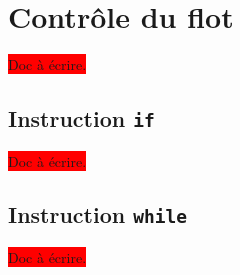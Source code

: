 




\chapter{Contrôle du flot}

\colorbox{red}{Doc à écrire.}


\section{Instruction \texttt{if}}

\colorbox{red}{Doc à écrire.}


\section{Instruction \texttt{while}}

\colorbox{red}{Doc à écrire.}

